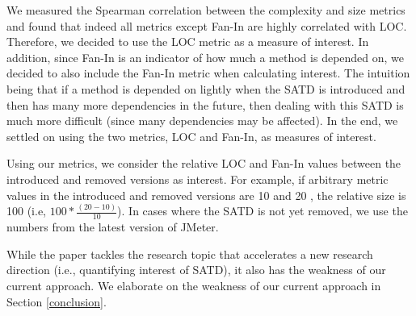 We measured the Spearman correlation between the complexity and size metrics and found that indeed all metrics except Fan-In are highly correlated with LOC. Therefore, we decided to use the LOC metric as a measure of interest. In addition, since Fan-In is an indicator of how much a method is depended on, we decided to also include the Fan-In metric when calculating interest. The intuition being that if a method is depended on lightly when the SATD is introduced and then has many more dependencies in the future, then dealing with this SATD is much more difficult (since many dependencies may be affected). In the end, we settled on using the two metrics, LOC and Fan-In, as measures of interest.


Using our metrics, we consider the relative LOC and Fan-In values between the introduced and removed versions as interest.  For example, if arbitrary metric values in the introduced and removed versions are 10 and 20 , the relative size is 100 (i.e, $100* \frac{(20-10)}{10}$). In cases where the SATD is not yet removed, we use the numbers from the latest version of JMeter.  

While the paper tackles the research topic that accelerates a new research direction (i.e., quantifying interest of SATD), it also has the weakness of our current approach. We elaborate on the weakness of our current approach in Section \ref{conclusion}.


